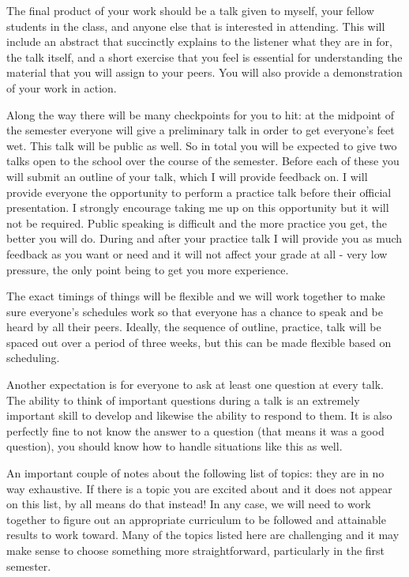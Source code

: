 \documentclass{article}
\begin{document}
The final product of your work should be a talk given to myself, your fellow students in the class, and anyone else that is interested in attending.
This will include an abstract that succinctly explains to the listener what they are in for, the talk itself, and a short exercise that you feel is essential for understanding the material that you will assign to your peers.
You will also provide a demonstration of your work in action.

Along the way there will be many checkpoints for you to hit: at the midpoint of the semester everyone will give a preliminary talk in order to get everyone's feet wet.
This talk will be public as well.
So in total you will be expected to give two talks open to the school over the course of the semester.
Before each of these you will submit an outline of your talk, which I will provide feedback on.
I will provide everyone the opportunity to perform a practice talk before their official presentation.
I strongly encourage taking me up on this opportunity but it will not be required.
Public speaking is difficult and the more practice you get, the better you will do.
During and after your practice talk I will provide you as much feedback as you want or need and it will not affect your grade at all - very low pressure, the only point being to get you more experience.

The exact timings of things will be flexible and we will work together to make sure everyone's schedules work so that everyone has a chance to speak and be heard by all their peers.
Ideally, the sequence of outline, practice, talk will be spaced out over a period of three weeks, but this can be made flexible based on scheduling.

Another expectation is for everyone to ask at least one question at every talk.
The ability to think of important questions during a talk is an extremely important skill to develop and likewise the ability to respond to them.
It is also perfectly fine to not know the answer to a question (that means it was a good question), you should know how to handle situations like this as well.

An important couple of notes about the following list of topics: they are in no way exhaustive.
If there is a topic you are excited about and it does not appear on this list, by all means do that instead!
In any case, we will need to work together to figure out an appropriate curriculum to be followed and attainable results to work toward.
Many of the topics listed here are challenging and it may make sense to choose something more straightforward, particularly in the first semester.
\end{document}
